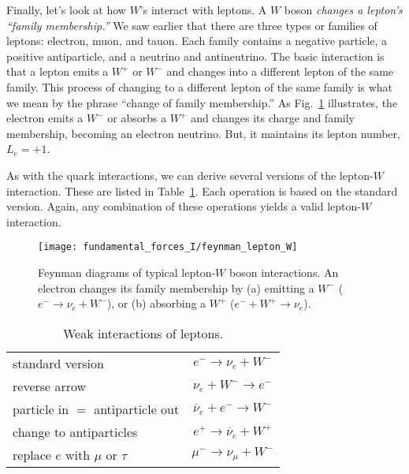 Finally, let's look at how $W$'s interact with leptons.  A $W$
boson {\em changes a lepton's ``family membership.''}  We saw
earlier that there are three types or families of leptons:
electron, muon, and tauon.  Each family contains a negative
particle, a positive antiparticle, and a neutrino and
antineutrino.  The basic interaction is that a lepton emits a
$W^+$ or $W^-$ and changes into a different lepton of the same
family.  This process of changing to a different lepton of the
same family is what we mean by the phrase ``change of family
membership.''  As Fig.~\ref{fig:feynman_lepton_W} illustrates, the
electron emits a $W^-$ or absorbs a $W^+$ and changes its charge
and family membership, becoming an electron neutrino.  But, it
maintains its lepton number, $L_e = +1$.

As with the quark interactions, we can derive several versions of
the lepton-$W$ interaction.  These are listed in
Table~\ref{table:weak_leptons}.  Each operation is based on the
standard version.  Again, any combination of these operations
yields a valid lepton-$W$ interaction.


\begin{figure}[!t]
\begin{center}
\begin{minipage}{10cm}
\begin{center}
\texttt{[image: fundamental\_forces\_I/feynman\_lepton\_W]}
\caption{Feynman diagrams of typical lepton-$W$ boson
interactions.  An electron changes its family membership by 
(a) emitting a $W^-$ ($e^- \rightarrow \nu_e + W^-$), or
(b) absorbing a $W^+$ ($e^- + W^+ \rightarrow \nu_e$).}
\label{fig:feynman_lepton_W}
\end{center}
\end{minipage}
\end{center}
\end{figure}

\begin{table}[!t]
\begin{center}
\caption{Weak interactions of leptons.} \label{table:weak_leptons}
\begin{tabular}[tbp]{lc}
\hline
standard version & $e^- \to \nu_e + W^-$ \\[0.5ex]
reverse arrow  & $\nu_e + W^- \to e^-$ \\[0.5ex]
particle in $=$ antiparticle out & $\overline\nu_e + e^- \to W^-$ \\[0.5ex]
change to antiparticles & $e^+ \to \overline\nu_e + W^+$\\[0.5ex]
replace $e$ with $\mu$ or $\tau$ & $\mu^- \to \nu_\mu + W^-$\\[0.5ex]
\hline
\end{tabular}
\end{center}
\end{table}

